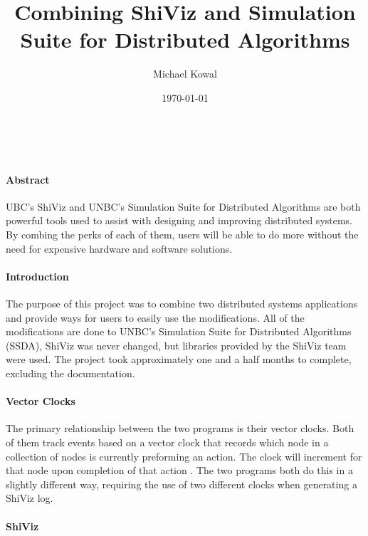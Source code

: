 \documentclass[12pt, oneside]{article}   	%
\title{Combining ShiViz and Simulation Suite for Distributed Algorithms}
\author{Michael Kowal}
\date{\today}
\begin{document}
\maketitle\ 
\paragraph{Abstract}

UBC's ShiViz and UNBC's Simulation Suite for Distributed Algorithms are both powerful tools used to assist with designing and improving distributed systems.  By combing the perks of each of them, users will be able to do more without the need for expensive hardware and software solutions.

\paragraph{Introduction}

The purpose of this project was to combine two distributed systems applications and provide ways for users to easily use the modifications.  All of the modifications are done to UNBC's Simulation Suite for Distributed Algorithms (SSDA), ShiViz was never changed, but libraries provided by the ShiViz team were used.  The project took approximately one and a half months to complete, excluding the documentation.  

\paragraph{Vector Clocks}

The primary relationship between the two programs is their vector clocks.  Both of them track events based on a vector clock that records which node in a collection of nodes is currently preforming an action.  The clock will increment for that node upon completion of that action \cite{VC1} \cite{VC2}.  The two programs both do this in a slightly different way, requiring the use of two different clocks when generating a ShiViz log.

\paragraph{ShiViz}
\end{document}
